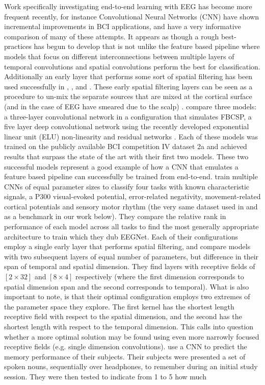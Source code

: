 \documentclass[utf8]{frontiersSCNS} %
\begin{document}

Work specifically investigating end-to-end learning with EEG has become more frequent recently, for instance Convolutional Neural Networks (CNN) have shown incremental improvements in BCI applications, and \cite{Schirrmeister2017} have a very informative comparison of many of these attempts. It appears as though a rough best-practices has begun to develop that is not unlike the feature based pipeline where models that focus on different interconnections between multiple layers of temporal convolutions and spatial convolutions perform the best for classification. Additionally an early layer that performs some sort of spatial filtering has been used successfully in \cite{Lawhern2017}, \cite{Sun}, and \cite{Schirrmeister2017}. These early spatial filtering layers can be seen as a procedure to un-mix the separate sources that are mixed at the cortical surface (and in the case of EEG have smeared due to the scalp) \cite{ElectricFieldsOfTheBrain_ch5and6}. \cite{Schirrmeister2017} compare three models: a three-layer convolutional network in a configuration that simulates FBCSP, a five layer deep convolutional network using the recently developed exponential linear unit (ELU) non-linearity  and residual networks \cite{He2015a}. Each of these models was trained on the publicly available BCI competition IV dataset 2a and achieved results that surpass the state of the art with their first two models. These two successful models represent a good example of how a CNN that emulates a feature based pipeline can successfully be trained from end-to-end. \cite{Lawhern2017} train multiple CNNs of equal parameter sizes to classify four tasks with known characteristic signals, a P300 visual-evoked potential, error-related negativity, movement-related cortical potentials and sensory motor rhythm (the very same dataset used in \cite{Schirrmeister2017} and as a benchmark in our work below). They compare the relative rank in performance of each model across all tasks to find the most generally appropriate architecture to train which they dub EEGNet. Each of their configurations employ a single early layer that performs spatial filtering, and compare models with two subsequent layers of equal number of parameters, but difference in their span of temporal and spatial dimension. They find layers with receptive fields of $[2 \times 32]$ and $[8 \times 4]$ respectively (where the first dimension corresponds to spatial dimension span and the second corresponds to temporal). What is also important to note, is that their optimal configuration employs two extremes of the parameter space they explore. The first kernel has the shortest length receptive field with respect to the spatial dimension, and the second has the shortest length with respect to the temporal dimension. This calls into question whether a more optimal solution may be found using even more narrowly focused receptive fields (e.g. single dimension convolutions). \cite{Sun} use a CNN to predict the memory performance of their subjects. Their subjects were presented a set of spoken nouns, sequentially over headphones, to remember during an initial study session. They were then tested to indicate from 1 to 5 how much 
\end{document}
